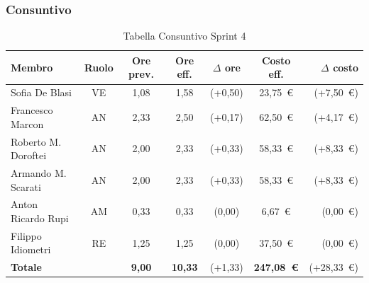 \subsubsection{Consuntivo}
\begin{table}[H]
    \centering
    \renewcommand{\arraystretch}{1.3}
    \begin{tabularx}{\textwidth}{|X|c|c|c|c|c|r|}
        \hline
        \textbf{Membro} & \textbf{Ruolo} & \textbf{Ore prev.} &
        \textbf{Ore eff.} & \textbf{$\Delta$ ore} &
        \textbf{Costo eff.} & \textbf{$\Delta$ costo} \\
        \hline
        Sofia De Blasi       & VE & 1,08 & 1,58 & {\color{red}(+0,50)}  & 23{,}75~\euro & {\color{red}(+7{,}50~\euro)} \\
        Francesco Marcon     & AN & 2,33 & 2,50 & {\color{red}(+0,17)}  & 62{,}50~\euro & {\color{red}(+4{,}17~\euro)} \\
        Roberto M. Doroftei  & AN & 2,00 & 2,33 & {\color{red}(+0,33)}  & 58{,}33~\euro & {\color{red}(+8{,}33~\euro)} \\
        Armando M. Scarati   & AN & 2,00 & 2,33 & {\color{red}(+0,33)}  & 58{,}33~\euro & {\color{red}(+8{,}33~\euro)} \\
        Anton Ricardo Rupi   & AM & 0,33 & 0,33 & {\color{green}(0,00)} & 6{,}67~\euro & {\color{green}(0{,}00~\euro)} \\
        Filippo Idiometri    & RE & 1,25 & 1,25 & {\color{green}(0,00)} & 37{,}50~\euro & {\color{green}(0{,}00~\euro)} \\
        \hline
        \textbf{Totale} & & \textbf{9,00} & \textbf{10,33} &
        {\color{red}(+1,33)} & \textbf{247{,}08~\euro} & {\color{red}(+28{,}33~\euro)} \\
        \hline
    \end{tabularx}
    \caption{Tabella Consuntivo Sprint 4}
\end{table}

